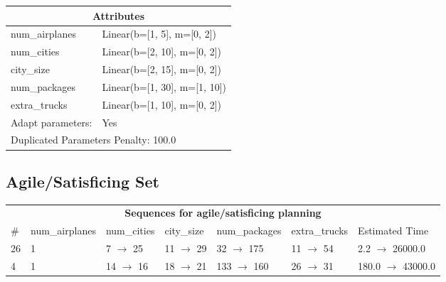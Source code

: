 \documentclass{article}
\begin{document}
                    \begin{center}
                    \begin{tabular}{p{}p{}}
                    \multicolumn{2}{c}{\bf \large Attributes}\\\midrule
                    num\_airplanes & Linear(b=[1, 5], m=[0, 2])\\
num\_cities & Linear(b=[2, 10], m=[0, 2])\\
city\_size & Linear(b=[2, 15], m=[0, 2])\\
num\_packages & Linear(b=[1, 30], m=[1, 10])\\
extra\_trucks & Linear(b=[1, 10], m=[0, 2])
                    
                    \\\midrule
                    Adapt parameters: & Yes  
                
                     \\\midrule
                    \multicolumn{2}{l}{Duplicated Parameters Penalty: 100.0}
                    \end{tabular}
                    \end{center}
                
                         \subsection*{Agile/Satisficing Set}

                        \begin{center}
                        \begin{tabular}{l|l|l|l|l|l|l}
                        \multicolumn{7}{c}{\bf \large Sequences for agile/satisficing planning}\\
                        \# & num\_airplanes & num\_cities & city\_size & num\_packages & extra\_trucks & Estimated Time\\\midrule
                        26&1&7 $\rightarrow$ 25&11 $\rightarrow$ 29&32 $\rightarrow$ 175&11 $\rightarrow$ 54&2.2 $\rightarrow$ 26000.0\\
4&1&14 $\rightarrow$ 16&18 $\rightarrow$ 21&133 $\rightarrow$ 160&26 $\rightarrow$ 31&180.0 $\rightarrow$ 43000.0
                        \end{tabular}
                        \end{center}
                    
\end{document}
